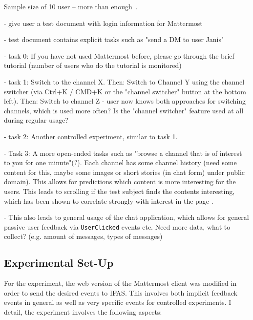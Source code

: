Sample size of 10 user -- more than enough~\cite{Turner2006}.

- give user a test document with login information for Mattermost

- test document contains explicit tasks such as "send a DM to user Janis"

- task 0: If you have not used Mattermost before, please go through the brief tutorial (number of users who do the tutorial is monitored)

- task 1: Switch to the channel X. Then: Switch to Channel Y using the channel switcher (via Ctrl+K / CMD+K or the "channel switcher" button at the bottom left). Then: Switch to channel Z - user now knows both approaches for switching channels, which is used more often? Is the "channel switcher" feature used at all during regular usage?

- task 2: Another controlled experiment, similar to task 1.

- Task 3: A more open-ended tasks such as "browse a channel that is of interest to you for one minute"(?).
Each channel has some channel history (need some content for this, maybe some images or short stories (in chat form) under public domain).
This allows for predictions which content is more interesting for the users.
This leads to scrolling if the test subject finds the contents interesting, which has been shown to correlate strongly with interest in the page \cite{Claypool2001}.

- This also leads to general usage of the chat application, which allows for general passive user feedback via \texttt{UserClicked} events etc.
Need more data, what to collect? (e.g. amount of messages, types of messages)

%

\subsection{Experimental Set-Up}

For the experiment, the web version of the Mattermost client was modified in order to send the desired events to \ac{IFAS}.
This involves both implicit feedback events in general as well as very specific events for controlled experiments.
I detail, the experiment involves the following aspects:

